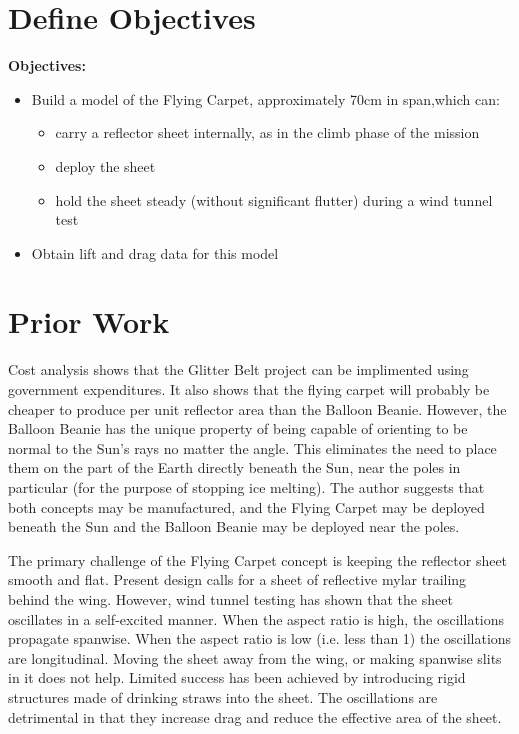 \documentclass[12pt]{report} %
\begin{document}
\chapter{Define Objectives}
 

{\bf Objectives:}
\begin{itemize}
	\item Build a model of the Flying Carpet, approximately 70cm in span,which can:
	\begin{itemize}
		\item carry a reflector sheet internally, as in the climb phase of the mission
		\item deploy the sheet
		\item hold the sheet steady (without significant flutter) during a wind tunnel test
	\end{itemize}
	\item Obtain lift and drag data for this model
\end{itemize}

\chapter{Prior Work}

Cost analysis shows that the Glitter Belt project can be implimented using government expenditures.  It also shows that the flying carpet
will probably be cheaper to produce per unit reflector area than the Balloon Beanie.  However, the Balloon Beanie has the unique property
of being capable of orienting to be normal to the Sun's rays no matter the angle.  This eliminates the need to place them on the part of
the Earth directly beneath the Sun, near the poles in particular (for the purpose of stopping ice melting).  The author suggests that
both concepts may be manufactured, and the Flying Carpet may be deployed beneath the Sun and the Balloon Beanie may be deployed near the
poles.

The primary challenge of the Flying Carpet concept is keeping the reflector sheet smooth and flat.  Present design calls for a sheet
of reflective mylar trailing behind the wing.  However, wind tunnel testing has shown that the sheet oscillates in a self-excited manner.
 When the aspect ratio is high, the oscillations propagate spanwise.  When the aspect ratio is low (i.e. less than 1) the oscillations
are longitudinal.  Moving the sheet away from the wing, or making spanwise slits in it does not help.  Limited success has been achieved
by introducing rigid structures made of drinking straws into the sheet.  The oscillations are detrimental in that they increase drag
and reduce the effective area of the sheet.
\end{document}
